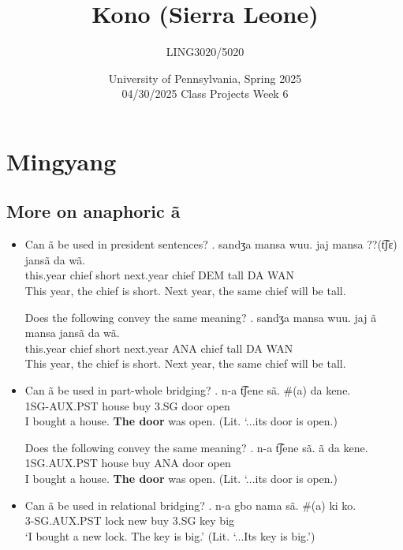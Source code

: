 \documentclass{assets/fieldnotes}
\title{Kono (Sierra Leone)}
\author{LING3020/5020}
\date{University of Pennsylvania, Spring 2025\\04/30/2025 Class Projects Week 6}
\begin{document}
\maketitle

\maketitle
\tableofcontents



 \section{Mingyang}
\subsection{More on anaphoric ã}
\begin{itemize}
    \item Can ã be used in president sentences?
    \exg. sandʒa mansa wuu. jaj mansa ??(t͡ʃɛ) jansã da wã.\\
   this.year chief short next.year chief DEM tall DA WAN\\
   This year, the chief is short. Next year, the same chief will be tall.

    Does the following convey the same meaning?
    \exg. sandʒa mansa wuu. jaj ã mansa jansã da wã.\\
   this.year chief short next.year ANA chief tall DA WAN\\
   This year, the chief is short. Next year, the same chief will be tall.

   \item Can ã be used in part-whole bridging?
    \exg. n-a t͡ʃene sã. \#(a) da kene.\\
        1SG-AUX.PST house buy 3.SG door open\\
        I bought a house. \textbf{The door} was open. (Lit. `...its door is open.)

    Does the following convey the same meaning?
    \exg. n-a t͡ʃene sã. ã da kene.\\
        1SG.AUX.PST house buy ANA door open\\
         I bought a house. \textbf{The door} was open. (Lit. `...its door is open.)

    \item Can ã be used in relational bridging?
    \exg. n-a gbo nama sã. \#(a) ki ko.\\
        3-SG.AUX.PST lock new buy 3.SG key big\\
        `I bought a new lock. The key is big.' (Lit. `...Its key is big.')


\end{itemize}
\end{document}
